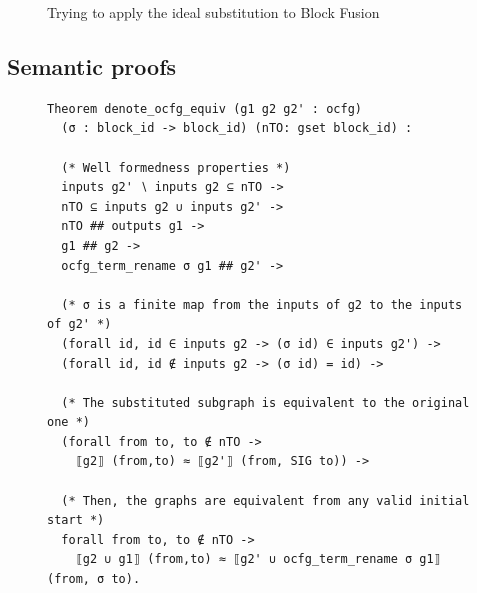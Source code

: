 \documentclass{beamer}
\begin{document}
\begin{frame}[noframenumbering]
  \begin{figure}
    \caption{Trying to apply the ideal substitution to Block Fusion}
  \end{figure}
\end{frame}

\subsection*{Semantic proofs}

\begin{frame}
  \begin{figure}
    \begin{lstlisting}[style=customcoq,basicstyle=\footnotesize\ttfamily]
Theorem denote_ocfg_equiv (g1 g2 g2' : ocfg)
  (σ : block_id -> block_id) (nTO: gset block_id) :

  (* Well formedness properties *)
  inputs g2' ∖ inputs g2 ⊆ nTO -> 
  nTO ⊆ inputs g2 ∪ inputs g2' -> 
  nTO ## outputs g1 ->
  g1 ## g2 -> 
  ocfg_term_rename σ g1 ## g2' ->

  (* σ is a finite map from the inputs of g2 to the inputs of g2' *)
  (forall id, id ∈ inputs g2 -> (σ id) ∈ inputs g2') ->
  (forall id, id ∉ inputs g2 -> (σ id) = id) ->
  
  (* The substituted subgraph is equivalent to the original one *)
  (forall from to, to ∉ nTO -> 
    ⟦g2⟧ (from,to) ≈ ⟦g2'⟧ (from, SIG to)) ->

  (* Then, the graphs are equivalent from any valid initial start *)
  forall from to, to ∉ nTO ->
    ⟦g2 ∪ g1⟧ (from,to) ≈ ⟦g2' ∪ ocfg_term_rename σ g1⟧ (from, σ to).
      \end{lstlisting}
    \label{fig:ocfg_equiv}
  \end{figure}
\end{frame}
\end{document}

